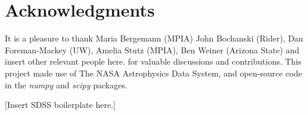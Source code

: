 \documentclass[12pt, preprint]{aastex}
\newcommand{\project}[1]{\textsl{#1}}
\newcommand{\tc}{\project{The~Cannon}}
\begin{document}

%
%
%
%

\section*{Acknowledgments}
It is a pleasure to thank Maria Bergemann (MPIA)
  John Bochanski (Rider),
  Dan Foreman-Mackey (UW), Amelia Stutz (MPIA), Ben Weiner (Arizona State) and
insert other relevant people here.
for valuable discussions and contributions.
This project made use of
  The NASA Astrophysics Data System,
  and open-source code in the \project{numpy} and \project{scipy} packages.

[Insert SDSS boilerplate here.]


\end{document}
